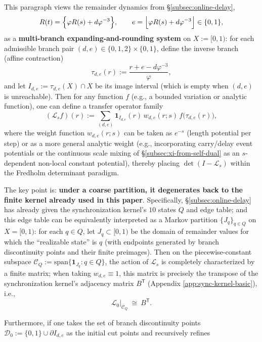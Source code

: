 \begin{remark}\label{rem:remainder-map-transfer-operator-refinement}
This paragraph views the remainder dynamics from \S\ref{subsec:online-delay},
\[
R(t)=\Bigl\{\varphi R(s)+d\varphi^{-3}\Bigr\},\qquad
e=\Bigl\lfloor \varphi R(s)+d\varphi^{-3}\Bigr\rfloor\in\{0,1\},
\]
as a \textbf{multi-branch expanding-and-rounding system} on \(X:=[0,1)\): for each admissible branch pair \((d,e)\in\{0,1,2\}\times\{0,1\}\), define the inverse branch (affine contraction)
\[
\tau_{d,e}(r):=\frac{r+e-d\varphi^{-3}}{\varphi},
\]
and let \(I_{d,e}:=\tau_{d,e}(X)\cap X\) be its image interval (which is empty when \((d,e)\) is unreachable). Then for any function \(f\) (e.g., a bounded variation or analytic function), one can define a transfer operator family
\[
(\mathcal{L}_s f)(r)
:=\sum_{(d,e)}\mathbf{1}_{I_{d,e}}(r)\,w_{d,e}(r;s)\,f\!\bigl(\tau_{d,e}(r)\bigr),
\]
where the weight function \(w_{d,e}(r;s)\) can be taken as \(e^{-s}\) (length potential per step) or as a more general analytic weight (e.g., incorporating carry/delay event potentials or the continuous scale mixing of \S\ref{subsec:xi-from-self-dual} as an \(s\)-dependent non-local constant potential), thereby placing \(\det(I-\mathcal{L}_s)\) within the Fredholm determinant paradigm.
\par
The key point is: \textbf{under a coarse partition, it degenerates back to the finite kernel already used in this paper}. Specifically, \S\ref{subsec:online-delay} has already given the synchronization kernel's $10$ states \(Q\) and edge table; and this edge table can be equivalently interpreted as a Markov partition \(\{J_q\}_{q\in Q}\) on \(X=[0,1)\):
for each \(q\in Q\), let \(J_q\subset[0,1)\) be the domain of remainder values for which the ``realizable state'' is \(q\) (with endpoints generated by branch discontinuity points and their finite preimages).
Then on the piecewise-constant subspace
\(
\mathcal{C}_Q:=\mathrm{span}\{\mathbf{1}_{J_q}:q\in Q\}
\),
the action of \(\mathcal{L}_s\) is completely characterized by a finite matrix; when taking \(w_{d,e}\equiv 1\), this matrix is precisely the transpose of the synchronization kernel's adjacency matrix \(B^{\mathsf T}\) (Appendix \ref{app:sync-kernel-basic}), i.e.,
\[
\mathcal{L}_0|_{\mathcal{C}_Q}\ \cong\ B^{\mathsf T}.
\]
\par
Furthermore, if one takes the set of branch discontinuity points \(\mathcal{D}_0:=\{0,1\}\cup\partial I_{d,e}\) as the initial cut points and recursively refines

\end{remark}
